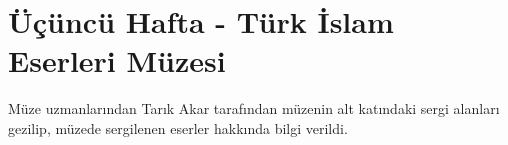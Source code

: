 \section{Üçüncü Hafta  - Türk İslam Eserleri Müzesi}
\indent\indent Müze uzmanlarından Tarık Akar tarafından müzenin alt katındaki sergi alanları gezilip, müzede sergilenen eserler hakkında bilgi verildi. 


